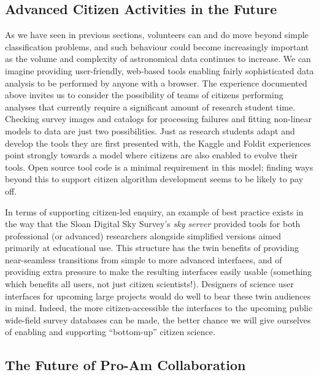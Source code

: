 \documentclass{ar2e}
\begin{document}
\subsection{Advanced Citizen Activities in the Future}

As we have seen in previous sections, volunteers can and do move beyond simple
classification problems, and such behaviour could become increasingly important
as the volume and complexity of astronomical data continues to increase.  We can
imagine providing user-friendly, web-based tools enabling  fairly sophisticated
data analysis to be performed by anyone with a browser. The experience
documented above invites us to consider the possibility of teams of citizens 
performing analyses that currently require a significant amount of research
student time.  Checking survey images and catalogs  for processing failures and
fitting non-linear models to data are just two possibilities. Just as research
students adapt and develop the tools they are first presented with, the Kaggle
and Foldit experiences point strongly towards a model where citizens are also
enabled to evolve their tools. Open source tool code is a minimal requirement in
this model; finding ways beyond this to support citizen algorithm development
seems to be likely to pay off.

In terms of supporting citizen-led enquiry, an example of best practice exists
in the way that the Sloan Digital Sky Survey's \emph{sky server} provided tools
for both professional (or advanced) researchers alongside simplified versions
aimed primarily at educational use. This structure has the twin benefits of
providing near-seamless transitions from simple to more advanced interfaces, and
of providing extra pressure to make the resulting interfaces easily usable 
(something which benefits all users, not just citizen scientists!). Designers of
science user interfaces for upcoming large projects would do well to bear these
twin audiences in mind. Indeed, the more citizen-accessible the interfaces to
the upcoming public wide-field survey databases can be made, the better chance
we will give ourselves of enabling and supporting ``bottom-up'' citizen
science.  

 


\subsection{The Future of Pro-Am Collaboration}
\end{document}
